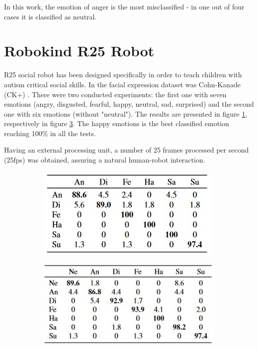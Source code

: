 \documentclass[runningheads,a4paper,12pt]{report}
\begin{document}
In this work, the emotion of anger is the most misclassified - in one out of four cases it is classified as neutral.

\section{Robokind R25 Robot}
R25 social robot has been designed specifically in order to teach children with autism critical social skills. In \cite{automatic-emotion} the facial expression dataset was Cohn-Kanade (CK+) \cite{ck}. There were two conducted experiments: the first one with seven emotions (angry, disgusted, fearful, happy, neutral, sad, surprised) and the second one with six emotions (without "neutral"). The results are presented in figure \ref{fig:ck1}, respectively in figure \ref{fig:ck2}. The happy emotions is the best classified emotion reaching 100\% in all the tests. 

Having an external processing unit, a number of 25 frames processed per second (25fps) was obtained, assuring a natural human-robot interaction.
\begin{figure}
	\centering

  \begin{subfigure}{.45\textwidth}
  	\centering
  	\includegraphics[width=\linewidth]{./images/2_ck1}
  	\caption{}
  	\label{fig:ck1}
  \end{subfigure} 
  \hfill  
  \begin{subfigure}{.45\textwidth}
  	\centering
  	\includegraphics[width=\linewidth]{./images/2_ck2}
  	\caption{}
  	\label{fig:ck2}
  \end{subfigure} 
\end{figure}
\end{document}
